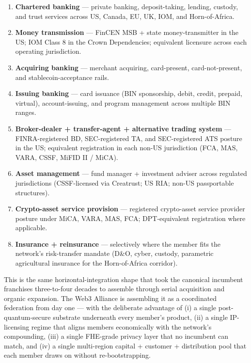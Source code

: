 \begin{enumerate}[leftmargin=2em,itemsep=0.1em]
\item \textbf{Chartered banking} --- private banking, deposit-taking,
lending, custody, and trust services across US, Canada, EU, UK, IOM,
and Horn-of-Africa.
\item \textbf{Money transmission} --- FinCEN MSB + state money-transmitter
in the US; IOM Class 8 in the Crown Dependencies; equivalent licensure
across each operating jurisdiction.
\item \textbf{Acquiring banking} --- merchant acquiring, card-present,
card-not-present, and stablecoin-acceptance rails.
\item \textbf{Issuing banking} --- card issuance (BIN sponsorship,
debit, credit, prepaid, virtual), account-issuing, and program
management across multiple BIN ranges.
\item \textbf{Broker-dealer + transfer-agent + alternative trading
system} --- FINRA-registered BD, SEC-registered TA, and SEC-registered
ATS posture in the US; equivalent registration in each non-US
jurisdiction (FCA, MAS, VARA, CSSF, MiFID II / MiCA).
\item \textbf{Asset management} --- fund manager + investment adviser
across regulated jurisdictions (CSSF-licensed via Creatrust; US RIA;
non-US passportable structures).
\item \textbf{Crypto-asset service provision} --- registered
crypto-asset service provider posture under MiCA, VARA, MAS, FCA;
DPT-equivalent registration where applicable.
\item \textbf{Insurance + reinsurance} --- selectively where the
member fits the network's risk-transfer mandate (D\&O, cyber, custody,
parametric agricultural insurance for the Horn-of-Africa corridor).
\end{enumerate}

This is the same horizontal-integration shape that took the canonical
incumbent franchises three-to-four decades to assemble through serial
acquisition and organic expansion. The Web3 Alliance is assembling it
as a coordinated federation from day one --- with the deliberate
advantage of (i) a single post-quantum-secure substrate underneath
every member's product, (ii) a single IP-licensing regime that aligns
members economically with the network's compounding, (iii) a single
FHE-grade privacy layer that no incumbent can match, and (iv) a single
multi-region capital + customer + distribution pool that each member
draws on without re-bootstrapping.

